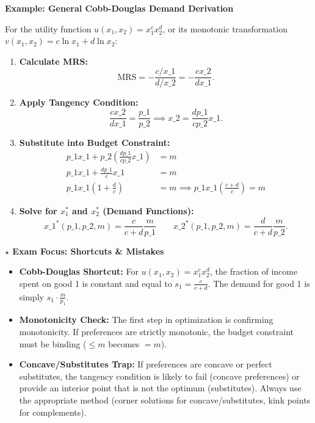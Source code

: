 \documentclass{article}
\begin{document}
\vspace{1em}
\noindent\textbf{Example: General Cobb-Douglas Demand Derivation}
\vspace{0.5em}

\noindent For the utility function $u(x_1, x_2) = x_1^c x_2^d$, or its monotonic transformation $v(x_1, x_2) = c \ln x_1 + d \ln x_2$:
\begin{enumerate}
    \item \textbf{Calculate MRS:} \[ \text{MRS} = -\frac{c/x\_1}{d/x\_2} = -\frac{c x\_2}{d x\_1}. \]
    \item \textbf{Apply Tangency Condition:} \[ \frac{c x\_2}{d x\_1} = \frac{p\_1}{p\_2} \implies x\_2 = \frac{d p\_1}{c p\_2} x\_1. \]
    \item \textbf{Substitute into Budget Constraint:} 
    \begin{align*} 
    p\_1 x\_1 + p\_2 \left(\frac{d p\_1}{c p\_2} x\_1\right) &= m \\ 
    p\_1 x\_1 + \frac{d p\_1}{c} x\_1 &= m \\ 
    p\_1 x\_1 \left(1 + \frac{d}{c}\right) &= m \implies p\_1 x\_1 \left(\frac{c+d}{c}\right) = m 
    \end{align*}
    \item \textbf{Solve for $x_1^*$ and $x_2^*$ (Demand Functions):} \[ x\_1^*(p\_1, p\_2, m) = \frac{c}{c+d} \frac{m}{p\_1} \qquad x\_2^*(p\_1, p\_2, m) = \frac{d}{c+d} \frac{m}{p\_2}. \]
\end{enumerate}

\vspace{0.5em}

\vspace{0.5em}

\noindent\textbf{$\star$ Exam Focus: Shortcuts \& Mistakes}
\begin{itemize}
    \item \textbf{Cobb-Douglas Shortcut:} For $u(x_1, x_2) = x_1^c x_2^d$, the fraction of income spent on good 1 is constant and equal to $s_1 = \frac{c}{c+d}$. The demand for good 1 is simply $s_1 \cdot \frac{m}{p_1}$.
    \item \textbf{Monotonicity Check:} The first step in optimization is confirming monotonicity. If preferences are strictly monotonic, the budget constraint must be binding ($\leq m$ becomes $= m$).
    \item \textbf{Concave/Substitutes Trap:} If preferences are concave or perfect substitutes, the tangency condition is likely to fail (concave preferences) or provide an interior point that is not the optimum (substitutes). Always use the appropriate method (corner solutions for concave/substitutes, kink points for complements).
\end{itemize}
\end{document}
